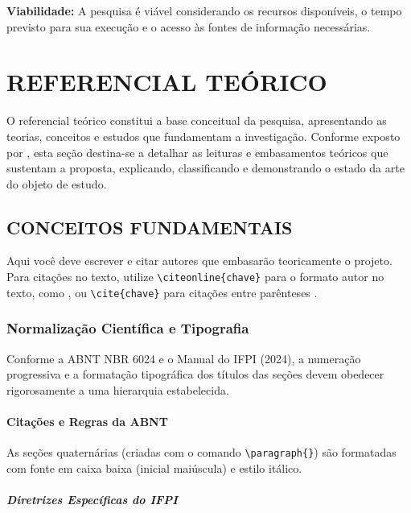 \documentclass[
    12pt,        %
    openany,     %
    oneside,     %
    a4paper,     %
    english,     %
    french,      %
    spanish,     %
    brazil,      %
    article      %
]{abntex2}
\begin{document}
\textbf{Viabilidade:} A pesquisa é viável considerando os recursos disponíveis, o tempo previsto para sua execução e o acesso às fontes de informação necessárias.


\section{REFERENCIAL TEÓRICO}
\label{sec:referencial}

O referencial teórico constitui a base conceitual da pesquisa, apresentando as teorias, conceitos e estudos que fundamentam a investigação. Conforme exposto por , esta seção destina-se a detalhar as leituras e embasamentos teóricos que sustentam a proposta, explicando, classificando e demonstrando o estado da arte do objeto de estudo.

\subsection{CONCEITOS FUNDAMENTAIS}
\label{subsec:fundamentacao1}

Aqui você deve escrever e citar autores que embasarão teoricamente o projeto. Para citações no texto, utilize \verb|\citeonline{chave}| para o formato autor no texto, como , ou \verb|\cite{chave}| para citações entre parênteses \cite{gil2019}.

\subsubsection{Normalização Científica e Tipografia}
\label{subsubsec:normalizacao}

Conforme a ABNT NBR 6024 e o Manual do IFPI (2024), a numeração progressiva e a formatação tipográfica dos títulos das seções devem obedecer rigorosamente a uma hierarquia estabelecida.

\paragraph{Citações e Regras da ABNT}
\label{para:citacoes}

As seções quaternárias (criadas com o comando \verb|\paragraph{}|) são formatadas com fonte em caixa baixa (inicial maiúscula) e estilo itálico.

\subparagraph{Diretrizes Específicas do IFPI}
\label{subpara:diretrizes}
\end{document}
